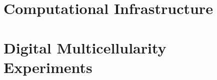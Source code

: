 

\part{Computational Infrastructure} \label{part:infrastructure}





\part{Digital Multicellularity Experiments} \label{part:experiments}





